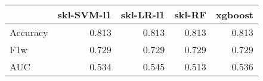 \begin{tabular}{lrrrr}
\toprule
{} &  skl-SVM-l1 &  skl-LR-l1 &  skl-RF &  xgboost \\
\midrule
Accuracy &       0.813 &      0.813 &   0.813 &    0.813 \\
F1w      &       0.729 &      0.729 &   0.729 &    0.729 \\
AUC      &       0.534 &      0.545 &   0.513 &    0.536 \\
\bottomrule
\end{tabular}
